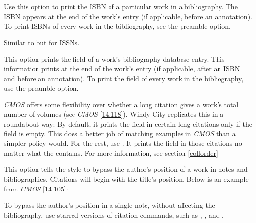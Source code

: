 \documentclass[11pt,letterpaper,oneside]{article}
\begin{document}
\begin{optionlist}


\noindent Use this option to print the ISBN of a particular work in a
bibliography. The ISBN appears at the end of the work's entry (if
applicable, before an annotation). To print ISBNs of every work in the
bibliography, see the  preamble option.


\noindent Similar to  but for ISSNs.


\noindent This option prints the  field of a work's
bibliography database entry. This information prints at the end of the
work's entry (if applicable, after an ISBN and before an annotation).
To print the  field of every work in the
bibliography, use the  preamble option.


\noindent \textit{CMOS} offers some flexibility over whether a long
citation gives a work's total number of volumes (see \textit{CMOS}
\ref{14.118}). Windy City replicates this in a roundabout way: By
default, it prints the  field in certain long
citations only if the  field is empty. This does a
better job of matching examples in \textit{CMOS} than a simpler policy
would. For the rest, use . It prints the
 field in those citations no matter what the
 contains. For more information, see section
\ref{collorder}.


\noindent This option tells the style to bypass the author's position
of a work in notes and bibliographies. Citations will begin with the
title's position. Below is an example from \textit{CMOS} \ref{14.105}:

\begin{citebib}
\item \cite{chaucer1966}
\end{citebib}

\noindent To bypass the author's position in a single note, without
affecting the bibliography, use starred versions of citation commands,
such as , , and .


\end{optionlist}
\end{document}
